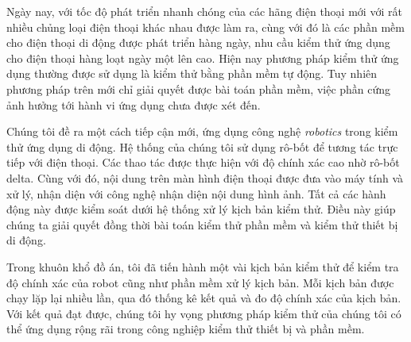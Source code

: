 \begin{vnabstract}
	\indent Ngày nay, với tốc độ phát triển nhanh chóng của các hãng điện thoại mới với rất nhiều chủng loại điện thoại khác nhau được làm ra, cùng với đó là các phần mềm cho điện thoại di động được phát triển hàng ngày, nhu cầu kiểm thử ứng dụng cho điện thoại hàng loạt ngày một lên cao. Hiện nay phương pháp kiểm thử ứng dụng thường được sử dụng là kiểm thử bằng phần mềm tự động. Tuy nhiên phương pháp trên mới chỉ giải quyết được bài toán phần mềm, việc phần cứng ảnh hưởng tới hành vi ứng dụng chưa được xét đến.
	
	Chúng tôi đề ra một cách tiếp cận mới, ứng dụng công nghệ \textit{robotics} trong kiểm thử ứng dụng di động. Hệ thống của chúng tôi sử dụng rô-bốt để tương tác trực tiếp với điện thoại. Các thao tác được thực hiện với độ chính xác cao nhờ rô-bốt delta. Cùng với đó, nội dung trên màn hình điện thoại được đưa vào máy tính và xử lý, nhận diện với công nghệ nhận diện nội dung hình ảnh. Tất cả các hành động này được kiểm soát dưới hệ thống xử lý kịch bản kiểm thử. Điều này giúp chúng ta giải quyết đồng thời bài toán kiểm thử phần mềm và kiểm thử thiết bị di động.
	
	Trong khuôn khổ đồ án, tôi đã tiến hành một vài kịch bản kiểm thử để kiểm tra độ chính xác của robot cũng như phần mềm xử lý kịch bản. Mỗi kịch bản được chạy lặp lại nhiều lần, qua đó thống kê kết quả và đo độ chính xác của kịch bản. Với kết quả đạt được, chúng tôi hy vọng phương pháp kiểm thử của chúng tôi có thể ứng dụng rộng rãi trong công nghiệp kiểm thử thiết bị và phần mềm.

\end{vnabstract}